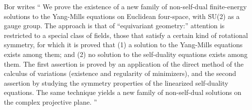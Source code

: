\begin{description}

Bor writes
``
We prove the existence of a new family of non-self-dual finite-energy
solutions to the Yang-Mills equations on Euclidean four-space, with SU(2)
as a gauge group. The approach is that of ``equivariant geometry:''
attention is restricted to a special class of fields, those that satisfy
a certain kind of rotational symmetry, for which it is proved that (1) a
solution to the Yang-Mills equations exists among them; and (2) no
solution to the self-duality equations exists among them. The first
assertion is proved by an application of the direct method of the
calculus of variations (existence and regularity of minimizers), and the
second assertion by studying the symmetry properties of the linearized
self-duality equations. The same technique yields a new family of
non-self-dual solutions on the complex projective plane.
''
\end{description}
